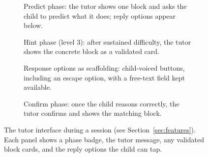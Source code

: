\documentclass[conference]{IEEEtran}
\begin{document}
\begin{figure}[!t]
\centering
\begin{subfigure}[t]{0.48\textwidth}
  \centering
  \fbox{\rule{0pt}{42mm}\rule{0.9\linewidth}{0pt}} %
  \caption{Predict phase: the tutor shows one block and asks the child to predict what it does; reply options appear below.}
  \label{fig:ui-predict}
\end{subfigure}
\hfill
\begin{subfigure}[t]{0.48\textwidth}
  \centering
  \fbox{\rule{0pt}{42mm}\rule{0.9\linewidth}{0pt}} %
  \caption{Hint phase (level 3): after sustained difficulty, the tutor shows the concrete block as a validated card.}
  \label{fig:ui-hint}
\end{subfigure}

\vspace{3mm}

\begin{subfigure}[t]{0.48\textwidth}
  \centering
  \fbox{\rule{0pt}{42mm}\rule{0.9\linewidth}{0pt}} %
  \caption{Response options as scaffolding: child-voiced buttons, including an escape option, with a free-text field kept available.}
  \label{fig:ui-options}
\end{subfigure}
\hfill
\begin{subfigure}[t]{0.48\textwidth}
  \centering
  \fbox{\rule{0pt}{42mm}\rule{0.9\linewidth}{0pt}} %
  \caption{Confirm phase: once the child reasons correctly, the tutor confirms and shows the matching block.}
  \label{fig:ui-confirm}
\end{subfigure}
\caption{The tutor interface during a session (see Section~\ref{sec:features}). Each panel shows a phase badge, the tutor message, any validated block cards, and the reply options the child can tap.}
\label{fig:ui}
\end{figure}
\end{document}
